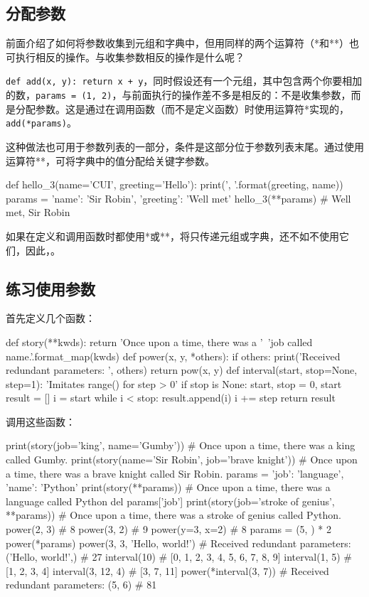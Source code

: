 \subsection{分配参数}
前面介绍了如何将参数收集到元组和字典中，但用同样的两个运算符（*和**）也可执行相反的操作。与收集参数相反的操作是什么呢？

\verb|def add(x, y): return x + y|，同时假设还有一个元组，其中包含两个你要相加的数，\verb|params = (1, 2)|，与前面执行的操作差不多是相反的：不是收集参数，而是分配参数。这是通过在调用函数（而不是定义函数）时使用运算符*实现的，\verb|add(*params)|。

这种做法也可用于参数列表的一部分，条件是这部分位于参数列表末尾。通过使用运算符**，可将字典中的值分配给关键字参数。
\begin{pyc}
def hello_3(name='CUI', greeting='Hello'):
    print('{}, {}'.format(greeting, name))
params = {'name': 'Sir Robin', 'greeting': 'Well met'}
hello_3(**params)  # Well met, Sir Robin
\end{pyc}
如果在定义和调用函数时都使用*或**，将只传递元组或字典，还不如不使用它们，因此，。
\subsection{练习使用参数}
首先定义几个函数：
\begin{pyc}
def story(**kwds):
    return 'Once upon a time, there was a '\
        '{job} called {name}.'.format_map(kwds)
def power(x, y, *others):
    if others:
        print('Received redundant parameters: ', others)
    return pow(x, y)
def interval(start, stop=None, step=1):
    'Imitates range() for step > 0'
    if stop is None:
        start, stop = 0, start
    result = []
    i = start
    while i < stop:
        result.append(i)
        i += step
    return result
\end{pyc}
调用这些函数：
\begin{pyc}
print(story(job='king', name='Gumby'))
# Once upon a time, there was a king called Gumby.
print(story(name='Sir Robin', job='brave knight'))
# Once upon a time, there was a brave knight called Sir Robin.
params = {'job': 'language', 'name': 'Python'}
print(story(**params))
# Once upon a time, there was a language called Python
del params['job']
print(story(job='stroke of genius', **params))
# Once upon a time, there was a stroke of genius called Python.
power(2, 3)  # 8
power(3, 2)  # 9
power(y=3, x=2)  # 8
params = (5, ) * 2
power(*params)
power(3, 3, 'Hello, world!')
# Received redundant parameters:  ('Hello, world!',)
# 27
interval(10)  # [0, 1, 2, 3, 4, 5, 6, 7, 8, 9]
interval(1, 5)  # [1, 2, 3, 4]
interval(3, 12, 4)  # [3, 7, 11]
power(*interval(3, 7))
# Received redundant parameters:  (5, 6)
# 81
\end{pyc}

